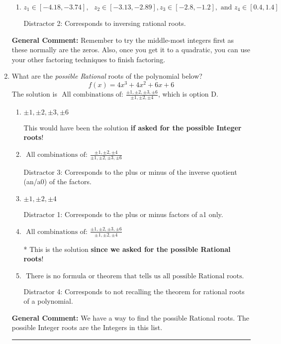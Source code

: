 \documentclass{extbook}[14pt]
\newcommand{\litem}[1]{\item #1

\rule{\textwidth}{0.4pt}}
\begin{document}
\begin{enumerate}
{\begin{enumerate}[label=\Alph*.]
 Distractor 1: Corresponds to negatives of all zeros.
\item \( z_1 \in [-4.18, -3.74], \text{   }  z_2 \in [-3.13, -2.89], z_3 \in [-2.8, -1.2], \text{   and   } z_4 \in [0.4, 1.4] \)

 Distractor 2: Corresponds to inversing rational roots.
\end{enumerate}

\textbf{General Comment:} Remember to try the middle-most integers first as these normally are the zeros. Also, once you get it to a quadratic, you can use your other factoring techniques to finish factoring.
}
\litem{
What are the \textit{possible Rational} roots of the polynomial below?
\[ f(x) = 4x^{3} +4 x^{2} +6 x + 6 \]The solution is \( \text{ All combinations of: }\frac{\pm 1,\pm 2,\pm 3,\pm 6}{\pm 1,\pm 2,\pm 4} \), which is option D.\begin{enumerate}[label=\Alph*.]
\item \( \pm 1,\pm 2,\pm 3,\pm 6 \)

This would have been the solution \textbf{if asked for the possible Integer roots}!
\item \( \text{ All combinations of: }\frac{\pm 1,\pm 2,\pm 4}{\pm 1,\pm 2,\pm 3,\pm 6} \)

 Distractor 3: Corresponds to the plus or minus of the inverse quotient (an/a0) of the factors. 
\item \( \pm 1,\pm 2,\pm 4 \)

 Distractor 1: Corresponds to the plus or minus factors of a1 only.
\item \( \text{ All combinations of: }\frac{\pm 1,\pm 2,\pm 3,\pm 6}{\pm 1,\pm 2,\pm 4} \)

* This is the solution \textbf{since we asked for the possible Rational roots}!
\item \( \text{ There is no formula or theorem that tells us all possible Rational roots.} \)

 Distractor 4: Corresponds to not recalling the theorem for rational roots of a polynomial.
\end{enumerate}

\textbf{General Comment:} We have a way to find the possible Rational roots. The possible Integer roots are the Integers in this list.
}
\end{enumerate}
\end{document}
